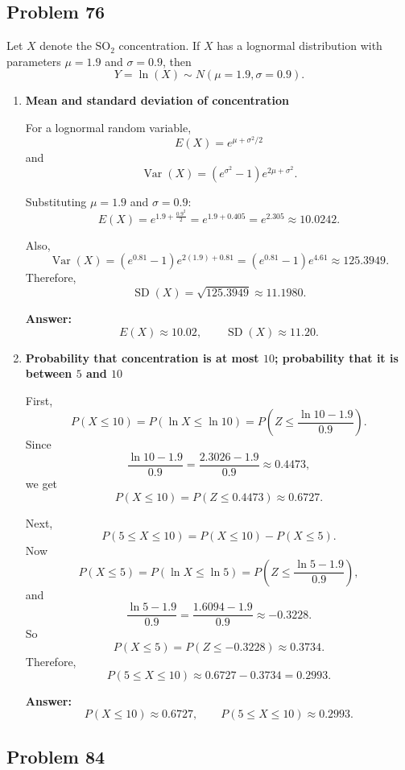 \documentclass[11pt]{article}
\begin{document}
\subsection*{Problem 76}

Let $X$ denote the $\text{SO}_2$ concentration. If $X$ has a lognormal distribution with parameters $\mu=1.9$ and $\sigma=0.9$, then
\[
Y=\ln(X)\sim N(\mu=1.9,\sigma=0.9).
\]

\begin{enumerate}
    \item[(a)] \textbf{Mean and standard deviation of concentration}

    For a lognormal random variable,
    \[
    E(X)=e^{\mu+\sigma^2/2}
    \]
    and
    \[
    \operatorname{Var}(X)=\left(e^{\sigma^2}-1\right)e^{2\mu+\sigma^2}.
    \]

    Substituting $\mu=1.9$ and $\sigma=0.9$:
    \[
    E(X)=e^{1.9+\frac{0.9^2}{2}}=e^{1.9+0.405}=e^{2.305}\approx 10.0242.
    \]

    Also,
    \[
    \operatorname{Var}(X)=\left(e^{0.81}-1\right)e^{2(1.9)+0.81}
    =\left(e^{0.81}-1\right)e^{4.61}\approx 125.3949.
    \]
    Therefore,
    \[
    \operatorname{SD}(X)=\sqrt{125.3949}\approx 11.1980.
    \]

    \textbf{Answer:}
    \[
    E(X)\approx 10.02,\qquad \operatorname{SD}(X)\approx 11.20.
    \]

    \item[(b)] \textbf{Probability that concentration is at most $10$; probability that it is between $5$ and $10$}

    First,
    \[
    P(X\le 10)=P(\ln X\le \ln 10)
    =P\left(Z\le \frac{\ln 10-1.9}{0.9}\right).
    \]
    Since
    \[
    \frac{\ln 10-1.9}{0.9}=\frac{2.3026-1.9}{0.9}\approx 0.4473,
    \]
    we get
    \[
    P(X\le 10)=P(Z\le 0.4473)\approx 0.6727.
    \]

    Next,
    \[
    P(5\le X\le 10)=P(X\le 10)-P(X\le 5).
    \]
    Now
    \[
    P(X\le 5)=P(\ln X\le \ln 5)
    =P\left(Z\le \frac{\ln 5-1.9}{0.9}\right),
    \]
    and
    \[
    \frac{\ln 5-1.9}{0.9}=\frac{1.6094-1.9}{0.9}\approx -0.3228.
    \]
    So
    \[
    P(X\le 5)=P(Z\le -0.3228)\approx 0.3734.
    \]
    Therefore,
    \[
    P(5\le X\le 10)\approx 0.6727-0.3734=0.2993.
    \]

    \textbf{Answer:}
    \[
    P(X\le 10)\approx 0.6727,
    \qquad
    P(5\le X\le 10)\approx 0.2993.
    \]
\end{enumerate}

\subsection*{Problem 84}
\end{document}
